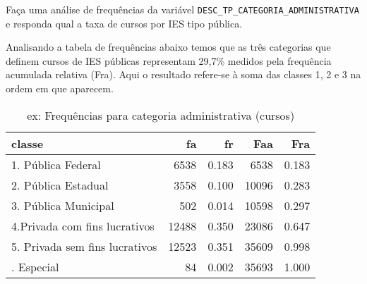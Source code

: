 \documentclass[11pt,]{style/krantz}
\makeatletter
\newenvironment{Shaded}{\begin{snugshade}}{\end{snugshade}}
\newcommand{\DataTypeTok}[1]{\textcolor[rgb]{0.13,0.29,0.53}{#1}}
\newcommand{\DecValTok}[1]{\textcolor[rgb]{0.00,0.00,0.81}{#1}}
\newcommand{\KeywordTok}[1]{\textcolor[rgb]{0.13,0.29,0.53}{\textbf{#1}}}
\newcommand{\NormalTok}[1]{#1}
\newcommand{\OperatorTok}[1]{\textcolor[rgb]{0.81,0.36,0.00}{\textbf{#1}}}
\newcommand{\OtherTok}[1]{\textcolor[rgb]{0.56,0.35,0.01}{#1}}
\newcommand{\StringTok}[1]{\textcolor[rgb]{0.31,0.60,0.02}{#1}}
\newenvironment{kframe}{%
\medskip{}
\setlength{\fboxsep}{.8em}
 \def\at@end@of@kframe{}%
 \ifinner\ifhmode%
  \def\at@end@of@kframe{\end{minipage}}%
  \begin{minipage}{\columnwidth}%
 \fi\fi%
 \def\FrameCommand##1{\hskip\@totalleftmargin \hskip-\fboxsep
 \colorbox{shadecolor}{##1}\hskip-\fboxsep
     \hskip-\linewidth \hskip-\@totalleftmargin \hskip\columnwidth}%
 \MakeFramed {\advance\hsize-\width
   \@totalleftmargin\z@ \linewidth\hsize
   \@setminipage}}%
 {\par\unskip\endMakeFramed%
 \at@end@of@kframe}
\renewenvironment{Shaded}{\begin{kframe}}{\end{kframe}}
\theoremstyle{definition}
\theoremstyle{definition}
\theoremstyle{definition}
\theoremstyle{remark}
\let\BeginKnitrBlock\begin \let\EndKnitrBlock\end
\makeatother
\begin{document}
\BeginKnitrBlock{exercise}
\protect\hypertarget{exr:unnamed-chunk-35}{}{\label{exr:unnamed-chunk-35} }Faça uma análise de frequências da variável \texttt{DESC\_TP\_CATEGORIA\_ADMINISTRATIVA} e responda qual a taxa de cursos por IES tipo pública.
\EndKnitrBlock{exercise}

\BeginKnitrBlock{solution}
\iffalse{} {Solução. } \fi{}Analisando a tabela de frequências abaixo temos que as três categorias que definem cursos de IES públicas representam 29,7\% medidos pela frequência acumulada relativa (Fra). Aqui o resultado refere-se à soma das classes 1, 2 e 3 na ordem em que aparecem.
\EndKnitrBlock{solution}

\begin{Shaded}
\end{Shaded}

\begin{table}[!h]

\caption{\label{tab:unnamed-chunk-37}ex: Frequências para categoria administrativa (cursos)}
\centering
\begin{tabular}{lrrrr}
\toprule
classe & fa & fr & Faa & Fra\\
\midrule
1. Pública Federal & 6538 & 0.183 & 6538 & 0.183\\
2. Pública Estadual & 3558 & 0.100 & 10096 & 0.283\\
3. Pública Municipal & 502 & 0.014 & 10598 & 0.297\\
4.Privada com fins lucrativos & 12488 & 0.350 & 23086 & 0.647\\
5. Privada sem fins lucrativos & 12523 & 0.351 & 35609 & 0.998\\
\addlinespace
7. Especial & 84 & 0.002 & 35693 & 1.000\\
\bottomrule
\end{tabular}
\end{table}
\end{document}
